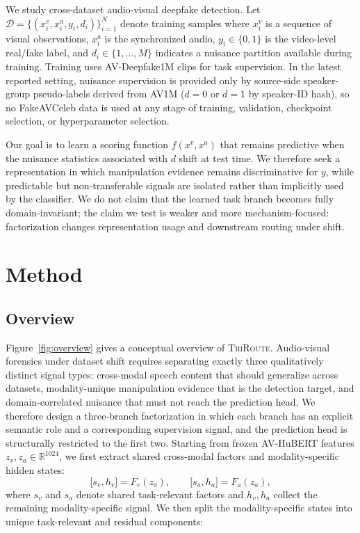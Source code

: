 \documentclass{article}
\newcommand{\method}{\textsc{TriRoute}}
\newcommand{\R}{\mathbb{R}}
\begin{document}
We study cross-dataset audio-visual deepfake detection. Let $\mathcal{D} = \{(x_i^v, x_i^a, y_i, d_i)\}_{i=1}^N$ denote training samples where $x_i^v$ is a sequence of visual observations, $x_i^a$ is the synchronized audio, $y_i \in \{0,1\}$ is the video-level real/fake label, and $d_i \in \{1,\dots,M\}$ indicates a nuisance partition available during training. Training uses AV-Deepfake1M clips for task supervision. In the latest reported setting, nuisance supervision is provided only by source-side speaker-group pseudo-labels derived from AV1M ($d=0$ or $d=1$ by speaker-ID hash), so no FakeAVCeleb data is used at any stage of training, validation, checkpoint selection, or hyperparameter selection.

Our goal is to learn a scoring function $f(x^v, x^a)$ that remains predictive when the nuisance statistics associated with $d$ shift at test time. We therefore seek a representation in which manipulation evidence remains discriminative for $y$, while predictable but non-transferable signals are isolated rather than implicitly used by the classifier. We do not claim that the learned task branch becomes fully domain-invariant; the claim we test is weaker and more mechanism-focused: factorization changes representation usage and downstream routing under shift.

\section{Method}

\subsection{Overview}

Figure~\ref{fig:overview} gives a conceptual overview of \method. Audio-visual forensics under dataset shift requires separating exactly three qualitatively distinct signal types: cross-modal speech content that should generalize across datasets, modality-unique manipulation evidence that is the detection target, and domain-correlated nuisance that must not reach the prediction head. We therefore design a three-branch factorization in which each branch has an explicit semantic role and a corresponding supervision signal, and the prediction head is structurally restricted to the first two. Starting from frozen AV-HuBERT features $z_v, z_a \in \R^{1024}$, we first extract shared cross-modal factors and modality-specific hidden states:
\begin{equation}
\big[s_v, h_v\big] = F_v(z_v), \qquad \big[s_a, h_a\big] = F_a(z_a),
\end{equation}
where $s_v$ and $s_a$ denote shared task-relevant factors and $h_v, h_a$ collect the remaining modality-specific signal. We then split the modality-specific states into unique task-relevant and residual components:
\end{document}
